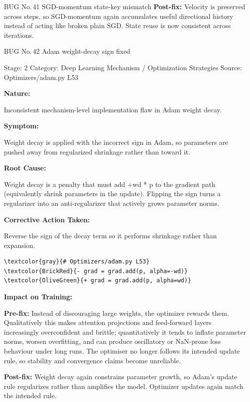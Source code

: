 \documentclass[10pt]{article}
\newcommand{\FieldLabel}[1]{%
 {\bfseries #1:}\par
}
\begin{document}
\begin{bugbox}{BUG No.\,41 \quad SGD-momentum state-key mismatch}
\textbf{Post-fix:} Velocity is preserved across steps, so SGD-momentum again accumulates useful directional history instead of acting like broken plain SGD. State reuse is now consistent across iterations.
\par
\vspace{0.35em}
\end{bugbox}

\begin{bugbox}{BUG No.\,42 \quad Adam weight-decay sign fixed}
{\color{MetaGray}\small Stage: 2 \;\textbar\; Category: Deep Learning Mechanism / Optimization Strategies \;\textbar\; Source: Optimizers/adam.py L53\par}
\vspace{0.22em}
\FieldLabel{Nature}
Inconsistent mechanism-level implementation flaw in Adam weight decay.
\par
\vspace{0.35em}
\FieldLabel{Symptom}
Weight decay is applied with the incorrect sign in Adam, so parameters are pushed away from regularized shrinkage rather than toward it.
\par
\vspace{0.35em}
\FieldLabel{Root Cause}
Weight decay is a penalty that must add +wd * p to the gradient path (equivalently shrink parameters in the update). Flipping the sign turns a regularizer into an anti-regularizer that actively grows parameter norms.
\par
\vspace{0.35em}
\FieldLabel{Corrective Action Taken}
Reverse the sign of the decay term so it performs shrinkage rather than expansion.
\par
\vspace{0.35em}
\begin{Verbatim}[commandchars=\\\{\},fontsize=\footnotesize,breaklines=true,breaksymbol={},frame=leftline,framerule=2pt,rulecolor=\color{gray!40},xleftmargin=6pt,formatcom=\singlespacing]
\textcolor{gray}{# Optimizers/adam.py L53}
\textcolor{BrickRed}{- grad = grad.add(p, alpha=-wd)}
\textcolor{OliveGreen}{+ grad = grad.add(p, alpha=wd)}
\end{Verbatim}
\vspace{0.22em}
\FieldLabel{Impact on Training}
\textbf{Pre-fix:} Instead of discouraging large weights, the optimizer rewards them. Qualitatively this makes attention projections and feed-forward layers increasingly overconfident and brittle; quantitatively it tends to inflate parameter norms, worsen overfitting, and can produce oscillatory or NaN-prone loss behaviour under long runs. The optimiser no longer follows its intended update rule, so stability and convergence claims become unreliable. \par\smallskip
\textbf{Post-fix:} Weight decay again constrains parameter growth, so Adam's update rule regularizes rather than amplifies the model. Optimizer updates again match the intended rule. 
\par
\vspace{0.35em}
\end{bugbox}
\end{document}
